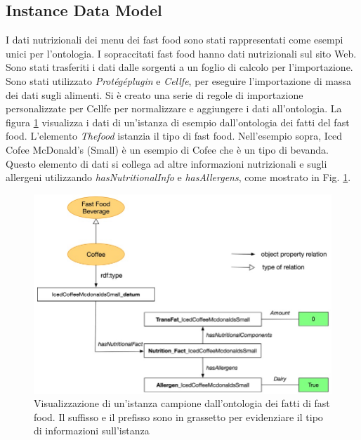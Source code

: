 \subsection{Instance Data Model}
I dati nutrizionali dei menu dei fast food sono stati rappresentati come esempi unici per l'ontologia. I sopraccitati fast food hanno dati nutrizionali sul sito Web. Sono stati trasferiti i dati dalle sorgenti a un foglio di calcolo per l'importazione. Sono stati utilizzato \emph{Protégéplugin} e \emph{Cellfe}, per eseguire l'importazione di massa dei dati sugli alimenti. 
Si è creato una serie di regole di importazione personalizzate per Cellfe per normalizzare e aggiungere i dati all'ontologia. La figura \ref{fig:OntologyInstance} visualizza i dati di un'istanza di esempio dall'ontologia dei fatti del fast food. L'elemento \emph{Thefood} istanzia il tipo di fast food. Nell'esempio sopra, Iced Cofee McDonald's (Small) è un esempio di Cofee che è un tipo di bevanda. Questo elemento di dati si collega ad altre informazioni nutrizionali e sugli allergeni utilizzando \emph{hasNutritionalInfo} e \emph{hasAllergens}, come mostrato in Fig. \ref{fig:OntologyInstance}. 

\begin{figure}[H]
    \centering
    \includegraphics[width=\textwidth]{res/WS_03_Ontology_Instance_Example.jpg}
    \caption{Visualizzazione di un'istanza campione dall'ontologia dei fatti di fast food. Il suffisso e il prefisso sono in grassetto per evidenziare il tipo di informazioni sull'istanza}
     \label{fig:OntologyInstance}
\end{figure}

